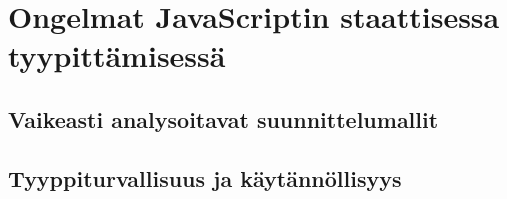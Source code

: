 \chapter{Ongelmat JavaScriptin staattisessa tyypittämisessä}

\section{Vaikeasti analysoitavat suunnittelumallit}

\section{Tyyppiturvallisuus ja käytännöllisyys}